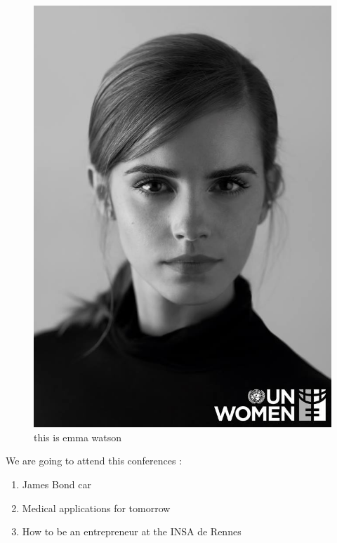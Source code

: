 \documentclass[12pt]{article}
\begin{document}
\begin{figure}[t]
\centerline{\includegraphics[scale=0.2]{picture}}
   \caption{\label{étiquette} this is emma watson}
\end{figure}

We are going to attend this conferences :
\begin{enumerate}
\item James Bond car
\item Medical applications for tomorrow
\item How to be an entrepreneur at the INSA de Rennes
\end{enumerate}
\end{document}
